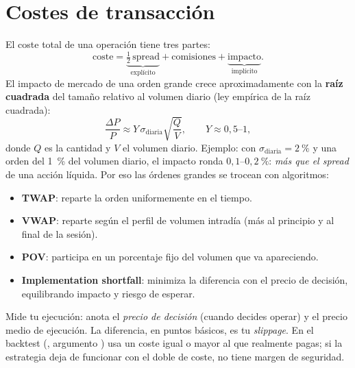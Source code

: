 \section{Costes de transacción}
El coste total de una operación tiene tres partes:
\begin{equation}
\text{coste} = \underbrace{\tfrac12\,\text{spread}}_{\text{explícito}} + \text{comisiones} + \underbrace{\text{impacto}}_{\text{implícito}} .
\end{equation}
El impacto de mercado de una orden grande crece aproximadamente con la \textbf{raíz cuadrada} del
tamaño relativo al volumen diario (ley empírica de la raíz cuadrada):
\begin{equation}\label{eq:impacto}
\frac{\Delta P}{P} \approx Y\,\sigma_{\text{diaria}}\sqrt{\frac{Q}{V}},\qquad Y\approx 0{,}5\text{--}1,
\end{equation}
donde $Q$ es la cantidad y $V$ el volumen diario. Ejemplo: con $\sigma_{\text{diaria}}=2~\%$ y una orden
del 1~\% del volumen diario, el impacto ronda $0{,}1$--$0{,}2~\%$: \emph{más que el spread} de una acción
líquida. Por eso las órdenes grandes se trocean con algoritmos:
\begin{itemize}
\item \textbf{TWAP}: reparte la orden uniformemente en el tiempo.
\item \textbf{VWAP}: reparte según el perfil de volumen intradía (más al principio y al final de la sesión).
\item \textbf{POV}: participa en un porcentaje fijo del volumen que va apareciendo.
\item \textbf{Implementation shortfall}: minimiza la diferencia con el precio de decisión, equilibrando impacto y riesgo de esperar.
\end{itemize}

\begin{practica}
Mide tu ejecución: anota el \emph{precio de decisión} (cuando decides operar) y el precio medio de
ejecución. La diferencia, en puntos básicos, es tu \emph{slippage}. En el backtest
(, argumento ) usa un coste igual o mayor al que realmente
pagas; si la estrategia deja de funcionar con el doble de coste, no tiene margen de seguridad.
\end{practica}

